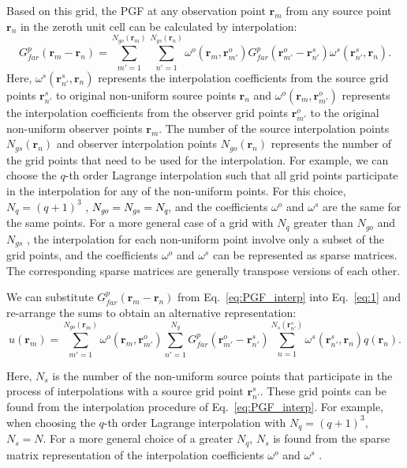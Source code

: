 \documentclass{article}
\begin{document}
Based on this grid, the PGF at any observation point $\mathbf{r}_m$ from any source point $\mathbf{r}_n$ in the zeroth unit cell can be calculated by interpolation: 
\begin{equation}\label{eq:PGF_interp}
    G^p_{far}(\mathbf{r}_m -\mathbf{r}_n)=\sum_{m'=1}^{N_{go}(\mathbf{r}_{m})}\sum_{n'=1}^{N_{gs}(\mathbf{r}_{n})}\omega^o(\mathbf{r}_m, \mathbf{r}_{m'}^o)G^p_{far}(\mathbf{r}_{m'}^o-\mathbf{r}_{n'}^s)\omega^s( \mathbf{r}_{n'}^s,\mathbf{r}_n).
\end{equation}
Here, $\omega^s( \mathbf{r}_{n'}^s,\mathbf{r}_n)$ represents the interpolation coefficients from the source grid points $\mathbf{r}_{n'}^s$  to original non-uniform source points $\mathbf{r}_{n}$ and $\omega^o(\mathbf{r}_{m}, \mathbf{r}_{m'}^o)$ represents the interpolation coefficients from the observer grid points $\mathbf{r}_{m'}^o$ to the original non-uniform observer points $\mathbf{r}_{m}$. The number of the source interpolation points $N_{gs}(\mathbf{r}_{n})$ and observer interpolation points $N_{go}(\mathbf{r}_{n})$ represents the number of the grid points that need to be used for the interpolation. For example, we can choose the $q$-th order Lagrange interpolation such that all grid points participate in the interpolation for any of the non-uniform points. For this choice, $N_q = (q+1)^3$ , \textcolor{black}{$N_{go}=N_{gs}=N_q$}, and the coefficients $\omega^o$ and $\omega^s$ are the same for the same points. For a more general case of a grid with $N_q$ greater than $N_{go}$ and $N_{gs}$ , the interpolation for each non-uniform point involve only a subset of the grid points, and the coefficients $\omega^o$ and $\omega^s$ can be represented as sparse matrices. The corresponding sparse matrices are generally transpose versions of each other.

We can substitute $G^p_{far}(\mathbf{r}_m - \mathbf{r}_n)$ from Eq.~\eqref{eq:PGF_interp} into Eq.~\eqref{eq:1} and re-arrange the sums to obtain an alternative representation:
\begin{equation}
    \label{eq:PSP_interp}
    u(\mathbf{r}_m)= \sum_{m'=1}^{N_{go}(\mathbf{r}_{m})}\omega^o(\mathbf{r}_m, \mathbf{r}_{m'}^o)\sum_{n'=1}^{N_g}G^p_{far}(\mathbf{r}_{m'}^o-\mathbf{r}_{n'}^s)\sum_{n=1}^{N_s(\mathbf{r}_{n'}^s)}\omega^s( \mathbf{r}_{n'}^s,\mathbf{r}_n)q(\mathbf{r}_n).
\end{equation}

Here, $N_s$ is the number of the non-uniform source points that participate in the process of interpolations with a source grid point $\mathbf{r}_{n'}^s$. These grid points can be found from the interpolation procedure of Eq.~\eqref{eq:PGF_interp}. For example, when choosing the $q$-th order Lagrange interpolation with $N_q = (q+1)^3$, $N_s=N$. For a more general choice of a greater $N_q$, $N_s$ is found from the sparse matrix representation of the interpolation coefficients $\omega^o$ and $\omega^s$ .
\end{document}
